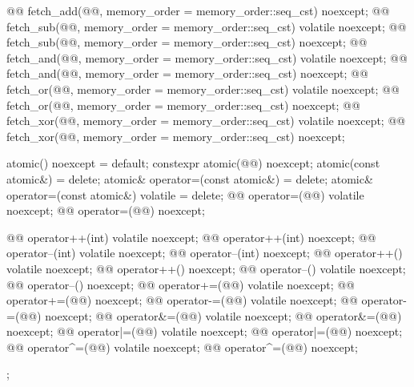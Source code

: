 \begin{codeblock}
{{    @@ fetch_add(@@, memory_order = memory_order::seq_cst) noexcept;
    @@ fetch_sub(@@, memory_order = memory_order::seq_cst) volatile noexcept;
    @@ fetch_sub(@@, memory_order = memory_order::seq_cst) noexcept;
    @@ fetch_and(@@, memory_order = memory_order::seq_cst) volatile noexcept;
    @@ fetch_and(@@, memory_order = memory_order::seq_cst) noexcept;
    @@ fetch_or(@@, memory_order = memory_order::seq_cst) volatile noexcept;
    @@ fetch_or(@@, memory_order = memory_order::seq_cst) noexcept;
    @@ fetch_xor(@@, memory_order = memory_order::seq_cst) volatile noexcept;
    @@ fetch_xor(@@, memory_order = memory_order::seq_cst) noexcept;

    atomic() noexcept = default;
    constexpr atomic(@@) noexcept;
    atomic(const atomic&) = delete;
    atomic& operator=(const atomic&) = delete;
    atomic& operator=(const atomic&) volatile = delete;
    @@ operator=(@@) volatile noexcept;
    @@ operator=(@@) noexcept;

    @@ operator++(int) volatile noexcept;
    @@ operator++(int) noexcept;
    @@ operator--(int) volatile noexcept;
    @@ operator--(int) noexcept;
    @@ operator++() volatile noexcept;
    @@ operator++() noexcept;
    @@ operator--() volatile noexcept;
    @@ operator--() noexcept;
    @@ operator+=(@@) volatile noexcept;
    @@ operator+=(@@) noexcept;
    @@ operator-=(@@) volatile noexcept;
    @@ operator-=(@@) noexcept;
    @@ operator&=(@@) volatile noexcept;
    @@ operator&=(@@) noexcept;
    @@ operator|=(@@) volatile noexcept;
    @@ operator|=(@@) noexcept;
    @@ operator^=(@@) volatile noexcept;
    @@ operator^=(@@) noexcept;
  };
}
\end{codeblock}

